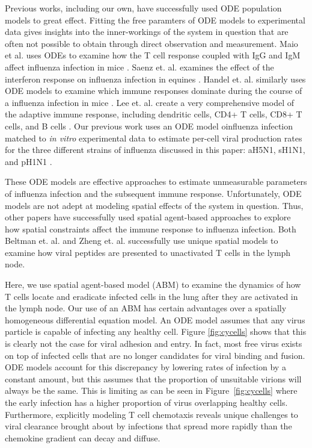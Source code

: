 \documentclass[10pt]{article}
\begin{document}
Previous works, including our own, have successfully used ODE population models to great effect.  Fitting the free paramters of ODE models to experimental data gives insights into the inner-workings of the system in question that are often not possible to obtain through direct observation and measurement.  Maio et al. uses ODEs to examine how the T cell response coupled with IgG and IgM affect influenza infection in mice \cite{Miao2010}.  Saenz et. al. examines the effect of the interferon response on influenza infection in equines \cite{Saenz2010}. Handel et. al. similarly uses ODE models to examine which immune responses dominate during the course of a influenza infection in mice \cite{Handel2008}.  Lee et. al. create a very comprehensive model of the adaptive immune response, including dendritic cells, CD4+ T cells, CD8+ T cells, and B cells \cite{Lee2009}.  Our previous work uses an ODE model oinfluenza infection matched to \textit{in vitro} experimental data to estimate per-cell viral production rates for the three different strains of influenza discussed in this paper: aH5N1, sH1N1, and pH1N1 \cite{Mitchell2011}.

These ODE models are effective approaches to estimate unmeasurable parameters of influenza infection and the subsequent immune response.  Unfortunately, ODE models are not adept at modeling spatial effects of the system in question.  Thus, other papers have successfully used spatial agent-based approaches to explore how spatial constraints affect the immune response to influenza infection.  Both Beltman et. al. \cite{Beltman2007} and Zheng et. al. \cite{Zheng2008} successfully use unique spatial models to examine how viral peptides are presented to unactivated T cells in the lymph node. 

Here, we use spatial agent-based model (ABM) to examine the dynamics of how T cells locate and eradicate infected cells in the lung after they are activated in the lymph node.  Our use of an ABM has certain advantages over a spatially homogeneous differential equation model.  An ODE model assumes that any virus particle is capable of infecting any healthy cell.  Figure \ref{fig:cycells} shows that this is clearly not the case for viral adhesion and entry.  In fact, most free virus exists on top of infected cells that are no longer candidates for viral binding and fusion.  ODE models account for this discrepancy by lowering rates of infection by a constant amount, but this assumes that the proportion of unsuitable virions will always be the same.  This is limiting as can be seen in Figure~\ref{fig:cycells} where the early infection has a higher proportion of virus overlapping healthy cells.  Furthermore, explicitly modeling T cell chemotaxis reveals unique challenges to viral clearance brought about by infections that spread more rapidly than the chemokine gradient can decay and diffuse.
\end{document}
